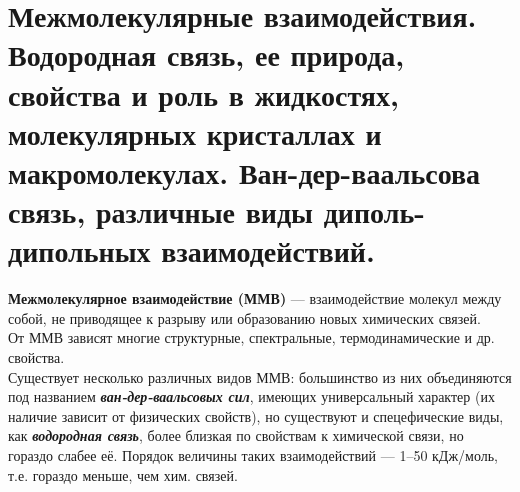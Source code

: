 \section{Межмолекулярные взаимодействия. Водородная связь, ее природа, свойства и роль в жидкостях, молекулярных кристаллах и макромолекулах. Ван-дер-ваальсова связь, различные виды диполь-дипольных взаимодействий.}

\textbf{Межмолекулярное взаимодействие (ММВ)} --- взаимодействие молекул между собой, не приводящее к разрыву или образованию новых химических связей.\\

От ММВ зависят многие структурные, спектральные, термодинамические и др. свойства.\\

Существует несколько различных видов ММВ: большинство из них объединяются под названием \textbf{\textit{ван-дер-ваальсовых сил}}, имеющих универсальный характер (их наличие зависит от физических свойств), но существуют и спецефические виды, как \textbf{\textit{водородная связь}}, более близкая по свойствам к химической связи, но гораздо слабее её. Порядок величины таких взаимодействий --- 1--50 кДж/моль, т.е. гораздо меньше, чем хим. связей.\\

